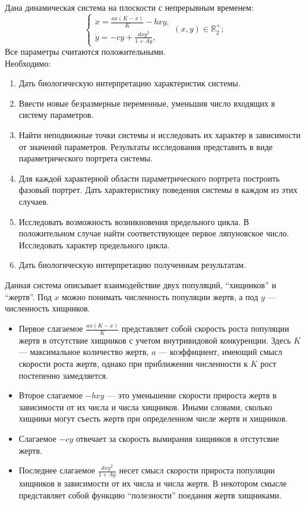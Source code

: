 \documentclass[10pt]{article}
\numberwithin{equation}{section}
\begin{document}
Дана динамическая система на плоскости с непрерывным временем:
\begin{equation}
	\begin{cases} \dot{x} = \frac{ax(K - x)}{K} - bxy, \\ \dot{y} = -cy + \frac{dxy^2}{1+Ay}, \end{cases} (x,y) \in \mathbb{R}_2^+;
\end{equation}
Все параметры считаются положительными. \medskip\\

Необходимо:
\begin{enumerate}
	\item Дать биологическую интерпретацию характеристик системы.
	\item Ввести новые безразмерные переменные, уменьшив число входящих в систему параметров.
	\item Найти неподвижные точки системы и исследовать их характер в зависимости от значений параметров. Результаты исследования представить в виде параметрического портрета системы.
	\item Для каждой характерной области параметрического портрета построить фазовый портрет. Дать характеристику поведения системы в каждом из этих случаев.
	\item Исследовать возможность возникновения предельного цикла. В положительном случае найти соответствующее первое ляпуновское число. Исследовать характер предельного цикла.
	\item Дать биологическую интерпретацию полученным результатам.
\end{enumerate}
Данная система описывает взаимодействие двух популяций, ``хищников'' и ``жертв''. Под \( x \) можно понимать численность популяции жертв, а под \( y \) --- численность хищников. 
\begin{itemize}
	\item Первое слагаемое \( \frac{ax(K - x)}{K} \) представляет собой скорость роста популяции жертв в отсутствие хищников с учетом внутривидовой конкуренции. Здесь \( K \) --- максимальное количество жертв, \( a \) --- коэффициент, имеющий смысл скорости роста жертв, однако при приближении численности к \( K \) рост постепенно замедляется. 
	\item Второе слагаемое \( -bxy \) --- это уменьшение скорости прироста жертв в зависимости от их числа и числа хищников. Иными словами, сколько хищники могут съесть жертв при определенном числе жертв и хищников. 
	\item Слагаемое \( -cy \) отвечает за скорость вымирания хищников в отстутсвие жертв. 
	\item Последнее слагаемое \( \frac{dxy^2}{1 + Ay} \) несет смысл скорости прироста популяции хищников в зависимости от их числа и числа жертв. В некотором смысле представляет собой функцию ``полезности'' поедания жертв хищниками.
\end{itemize}
\end{document}
